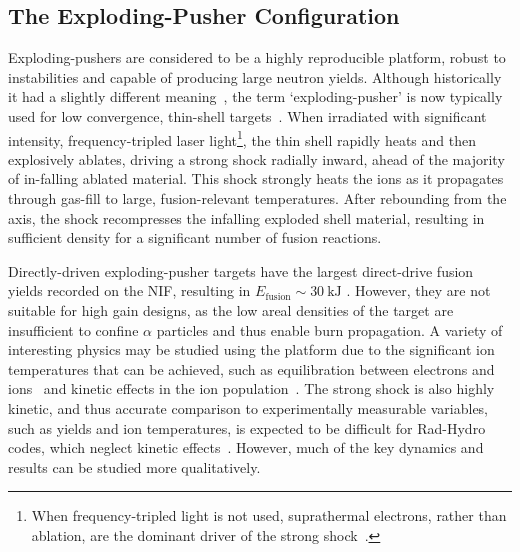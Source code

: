 \subsection{The Exploding-Pusher Configuration}%
\label{sec:Res2_expl}

Exploding-pushers are considered to be a highly reproducible platform, robust to instabilities and capable of producing large neutron yields.
Although historically it had a slightly different meaning~\cite{craxton_directdrive_2015}, the term `exploding-pusher' is now typically used for low convergence, thin-shell targets~\cite{ellison_development_2018}.
When irradiated with significant intensity, frequency-tripled laser light\footnote{When frequency-tripled light is not used, suprathermal electrons, rather than ablation, are the dominant driver of the strong shock~\cite{yeamans_high_2021}.}, the thin shell rapidly heats and then explosively ablates, driving a strong shock radially inward, ahead of the majority of in-falling ablated material.
This shock strongly heats the ions as it propagates through gas-fill to large, fusion-relevant temperatures.
After rebounding from the axis, the shock recompresses the infalling exploded shell material, resulting in sufficient density for a significant number of fusion reactions.

Directly-driven exploding-pusher targets have the largest direct-drive fusion yields recorded on the \ac{NIF}, resulting in $E_{\text{fusion}}\sim 30\ \text{kJ}$ \cite{yeamans_high_2021}.
However, they are not suitable for high gain designs, as the low areal densities of the target are insufficient to confine $\alpha$ particles and thus enable burn propagation.
A variety of interesting physics may be studied using the platform due to the significant ion temperatures that can be achieved, such as equilibration between electrons and ions~\cite{benedict_molecular_2012} and kinetic effects in the ion population~\cite{mannion_evidence_2023}.
The strong shock is also highly kinetic, and thus accurate comparison to experimentally measurable variables, such as yields and ion temperatures, is expected to be difficult for \ac{Rad-Hydro} codes, which neglect kinetic effects~\cite{larroche_ionkinetic_2016}.
However, much of the key dynamics and results can be studied more qualitatively.

